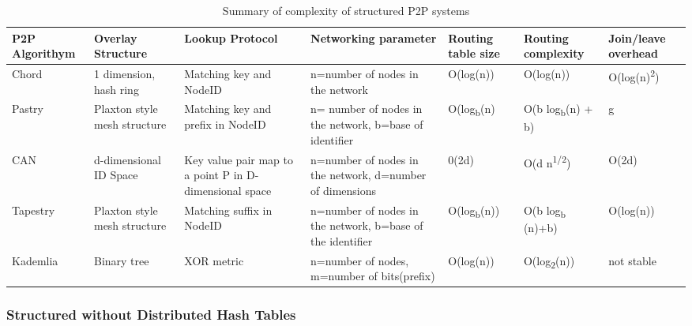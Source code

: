 \begin{table}[hb]
    \begin{center}

        \begin{tabular}{| p{1.3cm} | p{2.0cm} | p{2.9cm} | p{3.2cm} | p{1.6cm} | p{1.8cm} | p{1.8cm} |}
        \hline
        \bf{P2P Algorithym} & 
        \bf{Overlay Structure} & 
        \bf{Lookup Protocol} & 
        \bf{Networking parameter} & 
        \bf{Routing table size} & 
        \bf{Routing complexity} & 
        \bf{Join/leave overhead} \\ \hline

        Chord & 
        1 dimension, hash ring & 
        Matching key and NodeID & 
        n=number of nodes in the network & 
        O(log(n)) & 
        O(log(n)) & 
        O(log(n)\textsuperscript{2}) \\ \hline

        Pastry & 
        Plaxton style mesh structure & 
        Matching key and prefix in NodeID & 
        n= number of nodes in the network, b=base of identifier & 
        O(log\textsubscript{b}(n) & 
        O(b log\textsubscript{b}(n) + b) & 
        g \\ \hline

        CAN & 
        d-dimensional ID Space & 
        Key value pair map to a point P in D-dimensional space & 
        n=number of nodes in the network, d=number of dimensions & 
        0(2d) & 
        O(d n\textsuperscript{1/2}) & 
        O(2d) \\ \hline

        Tapestry & 
        Plaxton style mesh structure & 
        Matching suffix in NodeID & 
        n=number of nodes in the network, b=base of the identifier & 
        O(log\textsubscript{b}(n)) & 
        O(b log\textsubscript{b} (n)+b) & 
        O(log(n)) \\ \hline

        Kademlia & 
        Binary tree & 
        XOR metric & 
        n=number of nodes, m=number of bits(prefix) & 
        O(log(n)) & 
        O(log\textsubscript{2}(n)) & 
        not stable \\ \hline

        \end{tabular}
    \end{center}
\caption{Summary of complexity of structured P2P systems}
\label{table:p2pdht}
\end{table}	


\subsubsection{Structured without Distributed Hash Tables}\label{par:Structured without Non-Distributed Hash Tables}

